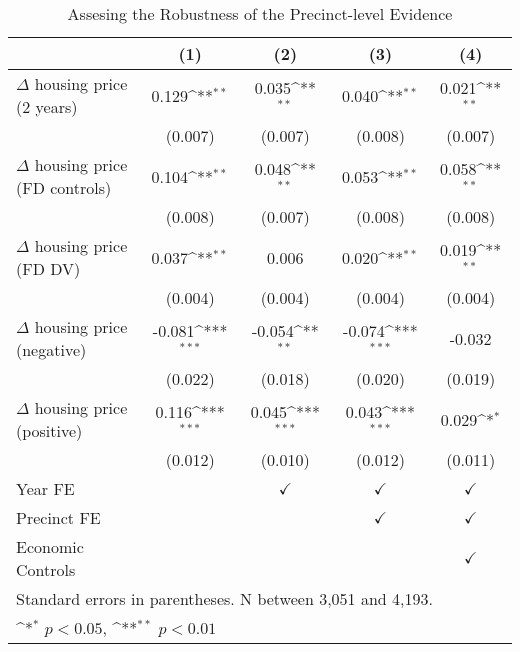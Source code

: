 \begin{table}[htbp]\centering
	\def\sym#1{\ifmmode^{#1}\else\(^{#1}\)\fi}
	\caption{Assesing the Robustness of the Precinct-level Evidence} \label{robustness}
	\begin{tabular}{l*{4}{c}}
		\hline\hline
		&\multicolumn{1}{c}{(1)}        &\multicolumn{1}{c}{(2)}        &\multicolumn{1}{c}{(3)}        &\multicolumn{1}{c}{(4)}        \\
\hline
$\Delta$ housing price (2 years)&       0.129\sym{**}&       0.035\sym{**}&       0.040\sym{**}&       0.021\sym{**}\\
&     (0.007)        &     (0.007)        &     (0.008)        &     (0.007)        \\
[1em]
$\Delta$ housing price (FD controls)&       0.104\sym{**}&       0.048\sym{**}&       0.053\sym{**}&       0.058\sym{**}\\
&     (0.008)        &     (0.007)        &     (0.008)        &     (0.008)        \\
[1em]
$\Delta$ housing price (FD DV)&       0.037\sym{**}&       0.006        &       0.020\sym{**}&       0.019\sym{**}\\
&     (0.004)        &     (0.004)        &     (0.004)        &     (0.004)        \\
[1em]
$\Delta$ housing price (negative)&      -0.081\sym{***}&      -0.054\sym{**} &      -0.074\sym{***}&      -0.032         \\
&     (0.022)         &     (0.018)         &     (0.020)         &     (0.019)         \\
[1em]
$\Delta$ housing price (positive)&       0.116\sym{***}&       0.045\sym{***}&       0.043\sym{***}&       0.029\sym{*}  \\
&     (0.012)         &     (0.010)         &     (0.012)         &     (0.011)         \\
[1em]
\hline Year FE  &                    & $\checkmark$                    &$\checkmark$        &$\checkmark$        \\
[1em]
Precinct FE  &                    &                    &$\checkmark$        &$\checkmark$        \\
[1em]
Economic Controls             &                    &                    &                    &$\checkmark$        \\
\hline\hline
\multicolumn{5}{l}{\footnotesize Standard errors in parentheses. N between 3,051 and 4,193.}\\
\multicolumn{5}{l}{\footnotesize \sym{*} \(p<0.05\), \sym{**} \(p<0.01\)}\\
\end{tabular}
\end{table}